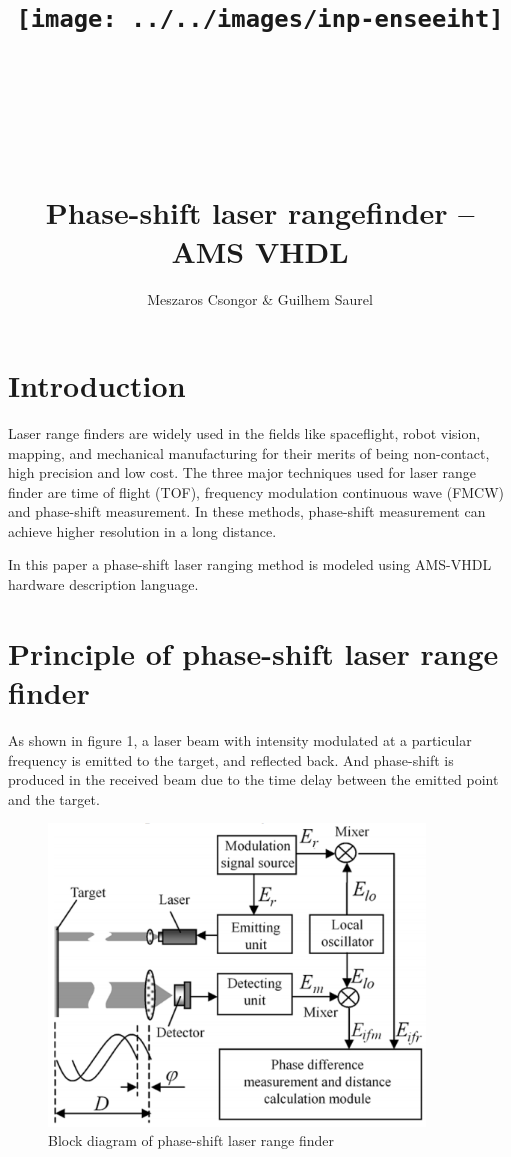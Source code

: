 \documentclass[fleqn]{article}
\title{\texttt{[image: ../../images/inp-enseeiht]} \\ ~ \\ ~ \\ ~ \\ ~ \\ Phase-shift  laser  rangefinder – AMS VHDL}
\author{Meszaros Csongor \& Guilhem Saurel}
\date{\oldstylenums{\today}}
\begin{document}
\begin{titlepage}
    \setcounter{page}{0}
    \maketitle
    \vfill
    \tableofcontents
    \thispagestyle{empty}
\end{titlepage}

\section{Introduction}

Laser range finders are widely used in the fields like spaceflight, robot vision, mapping, and mechanical manufacturing for their merits of being non-contact, high precision and low cost. The three major techniques used for laser range finder are time of flight (TOF), frequency modulation continuous wave (FMCW) and phase-shift measurement. In these methods, phase-shift measurement can achieve higher resolution in a long distance.

In this paper a phase-shift laser ranging method is modeled using AMS-VHDL hardware description language.

\section{Principle of phase-shift laser range finder}

As shown in figure 1, a laser beam with intensity modulated at a  particular frequency is emitted to the target, and reflected back. And phase-shift is produced in the received beam due to the time delay between the emitted point and the target.

\begin{figure}[h]
    \begin{center}
        \includegraphics[width=10cm]{block.png}
    \end{center}
    \caption{Block diagram of phase-shift laser range finder}
\end{figure}
\end{document}
